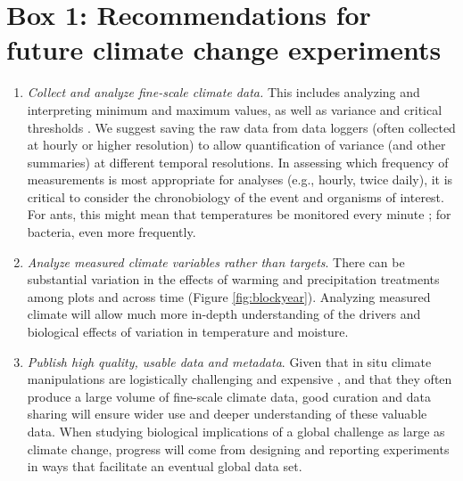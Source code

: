 \documentclass{article}
\begin{document}
\section* {Box 1: Recommendations for future climate change experiments} %
\begin{enumerate}
\item\textit{Collect and analyze fine-scale climate data.} This includes analyzing and interpreting minimum and maximum values, as well as variance and critical thresholds \citep[e.g., the number and duration of freeze-thaw events and accumulated chilling hours,][]{mcdaniel2014,vasseur2014}. We suggest saving the raw data from data loggers (often collected at hourly or higher resolution) to allow quantification of variance (and other summaries) at different temporal resolutions. In assessing which frequency of measurements is most appropriate for analyses (e.g., hourly, twice daily), it is critical to consider the chronobiology of the event and organisms of interest. For ants, this might mean that temperatures be monitored every minute \citep{shavit2017}; for bacteria, even more frequently. 
\item\textit{Analyze measured climate variables rather than targets}. There can be substantial variation in the effects of warming and precipitation treatments among plots and across time (Figure \ref{fig:blockyear}). Analyzing measured climate will allow much more in-depth understanding of the drivers and biological effects of variation in temperature and moisture.
\item\textit{Publish high quality, usable data and metadata}. Given that in situ climate manipulations are logistically challenging and expensive \citep{aronson2009}, and that they often produce a large volume of fine-scale climate data, good curation and data sharing will ensure wider use and deeper understanding of these valuable data. When studying biological implications of a global challenge as large as climate change, progress will come from designing and reporting experiments in ways that facilitate an eventual global data set. %

\end{enumerate}
\end{document}

